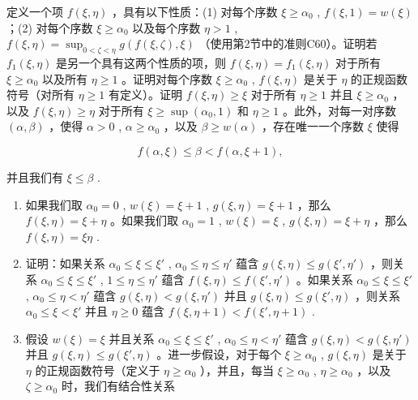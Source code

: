 定义一个项 \(f(\xi, \eta)\) ，具有以下性质：(1) 对每个序数 \(\xi \geqslant \alpha_0\) , \(f(\xi, 1) = w(\xi)\) ；(2) 对每个序数 \(\xi \geqslant \alpha_0\) 以及每个序数 \(\eta > 1\) , \(f(\xi, \eta) = \sup_{0 < \zeta < \eta} g(f(\xi, \zeta), \xi)\) （使用第2节中的准则C60）。证明若 \(f_1(\xi, \eta)\) 是另一个具有这两个性质的项，则 \(f(\xi, \eta) = f_1(\xi, \eta)\) 对于所有 \(\xi \geqslant \alpha_0\) 以及所有 \(\eta \geqslant 1\) 。证明对每个序数 \(\xi \geqslant \alpha_0\) , \(f(\xi, \eta)\) 是关于 \(\eta\) 的正规函数符号（对所有 \(\eta \geqslant 1\) 有定义）。证明 \(f(\xi, \eta) \geqslant \xi\) 对于所有 \(\eta \geqslant 1\) 并且 \(\xi \geqslant \alpha_0\) ，以及 \(f(\xi, \eta) \geqslant \eta\) 对于所有 \(\xi \geqslant \sup (\alpha_0, 1)\) 和 \(\eta \geqslant 1\) 。此外，对每一对序数 \((\alpha, \beta)\) ，使得 \(\alpha > 0\) , \(\alpha \geqslant \alpha_0\) ，以及 \(\beta \geqslant w(\alpha)\) ，存在唯一一个序数 \(\xi\) 使得

\[
f (\alpha , \xi) \leqslant \beta <   f (\alpha , \xi + 1),
\]

并且我们有 \(\xi \leqslant \beta\) .

\begin{enumerate}
\def\labelenumi{(\alph{enumi})}
\setcounter{enumi}{2}
\item
  如果我们取 \(\alpha_0 = 0\) , \(w(\xi) = \xi + 1\) , \(g(\xi, \eta) = \xi + 1\) ，那么 \(f(\xi, \eta) = \xi + \eta\) 。如果我们取 \(\alpha_0 = 1\) , \(w(\xi) = \xi\) , \(g(\xi, \eta) = \xi + \eta\) ，那么 \(f(\xi, \eta) = \xi \eta\) .
\item
  证明：如果关系 \(\alpha_0 \leqslant \xi \leqslant \xi'\) , \(\alpha_0 \leqslant \eta \leqslant \eta'\) 蕴含 \(g(\xi, \eta) \leqslant g(\xi', \eta')\) ，则关系 \(\alpha_0 \leqslant \xi \leqslant \xi'\) , \(1 \leqslant \eta \leqslant \eta'\) 蕴含 \(f(\xi, \eta) \leqslant f(\xi', \eta')\) 。如果关系 \(\alpha_0 \leqslant \xi \leqslant \xi'\) , \(\alpha_0 \leqslant \eta < \eta'\) 蕴含 \(g(\xi, \eta) < g(\xi, \eta')\) 并且 \(g(\xi, \eta) \leqslant g(\xi', \eta)\) ，则关系 \(\alpha_0 \leqslant \xi < \xi'\) 并且 \(\eta \geqslant 0\) 蕴含 \(f(\xi, \eta + 1) < f(\xi', \eta + 1)\) .
\item
  假设 \(w(\xi) = \xi\) 并且关系 \(\alpha_0 \leqslant \xi \leqslant \xi'\) , \(\alpha_0 \leqslant \eta < \eta'\) 蕴含 \(g(\xi, \eta) < g(\xi, \eta')\) 并且 \(g(\xi, \eta) \leqslant g(\xi', \eta)\) 。进一步假设，对于每个 \(\xi \geqslant \alpha_0\) , \(g(\xi, \eta)\) 是关于 \(\eta\) 的正规函数符号（定义于 \(\eta \geqslant \alpha_0\) ），并且，每当 \(\xi \geqslant \alpha_0\) , \(\eta \geqslant \alpha_0\) ，以及 \(\zeta \geqslant \alpha_0\) 时，我们有结合性关系
\end{enumerate}

